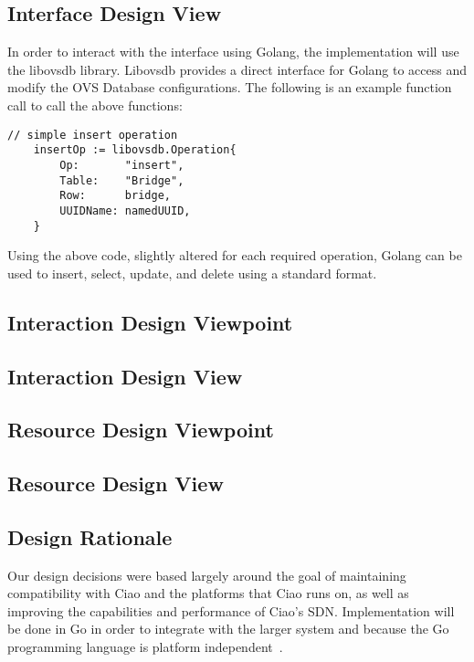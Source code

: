 \documentclass[10pt,onecolumn,journal,draftclsnofoot]{IEEEtran}
\begin{document}
\subsection{Interface Design View}
In order to interact with the interface using Golang, the implementation will
use the libovsdb library\cite{libovsdb}. Libovsdb provides a direct interface
for Golang to access and modify the OVS Database configurations. The following
is an example function call to call the above functions:\cite{gosample}\\

\begin{lstlisting}[caption=Example insert operation in the OVS Database]
	// simple insert operation
	insertOp := libovsdb.Operation{
		Op:       "insert",
		Table:    "Bridge",
		Row:      bridge,
		UUIDName: namedUUID,
	}
\end{lstlisting}

Using the above code, slightly altered for each required operation, Golang can
be used to insert, select, update, and delete using a standard format.
\subsection{Interaction Design Viewpoint}

\subsection{Interaction Design View}

\subsection{Resource Design Viewpoint}

\subsection{Resource Design View}

\subsection{Design Rationale}

Our design decisions were based largely around the goal of maintaining
compatibility with Ciao and the platforms that Ciao runs on, as well as
improving the capabilities and performance of Ciao's SDN. Implementation will be
done in Go in order to integrate with the larger system and because the Go
programming language is platform independent~\cite{gogoodfor}.
\end{document}
